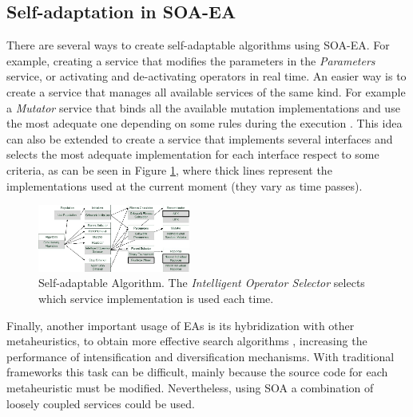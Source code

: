 \subsection{Self-adaptation in SOA-EA}
\label{sec:otherexamples}
There are several ways to create self-adaptable algorithms using SOA-EA. For example, creating a service that modifies the parameters in the {\em Parameters} service, or activating and de-activating operators in real time. An easier way is to create a service that manages all available services of the same kind. For example a {\em Mutator} service that binds all the available mutation implementations and use the most adequate one depending on some rules during the execution \citep{MUTATIONADAPTATION10}.  This idea can also be extended to create a service that implements several interfaces and selects the most adequate implementation for each interface respect to some criteria, as can be seen in Figure \ref{INTELLIGENTALGORITHM}, where thick lines represent the implementations used at the current moment (they vary as time passes).



\begin{figure}
\centering
\includegraphics[width=5cm]{gfx/soaea/intelligent.jpg}
\caption{Self-adaptable Algorithm. The {\em Intelligent Operator Selector} selects which service implementation is used each time.}
\label{INTELLIGENTALGORITHM}
\end{figure}


Finally, another important usage of EAs is its hybridization with other metaheuristics, to obtain more effective search algorithms \citep{HYBRID2010},  increasing the performance of intensification and diversification mechanisms. With  traditional frameworks this task can be difficult, mainly because the source code for each metaheuristic must be modified. Nevertheless, using SOA a combination of loosely coupled services could be used.

